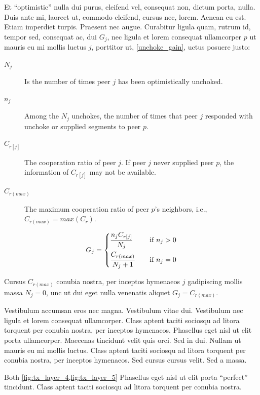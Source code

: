 Et ``optimistic'' nulla dui purus, eleifend vel, consequat non, dictum porta, nulla. Duis ante mi, laoreet ut, commodo eleifend, cursus nec, lorem. Aenean eu est. Etiam imperdiet turpis. Praesent nec augue. Curabitur ligula quam, rutrum id, tempor sed, consequat ac, dui $G_j$, nec ligula et lorem consequat ullamcorper $p$ ut mauris eu mi mollis luctus $j$, porttitor ut, \ref{unchoke_gain}, uctus posuere justo:

\begin{description}
  \item[$N_j$] Is the number of times peer $j$ has been optimistically unchoked.
  \item[$n_j$] Among the $N_j$ unchokes, the number of times that peer $j$ responded with unchoke or supplied segments to peer $p$.
  \item[$C_{r[j]}$] The cooperation ratio of peer $j$. If peer $j$ never supplied peer $p$, the information of $C_{r[j]}$ may not be available.
  \item[$C_{r (max)}$] The maximum cooperation ratio of peer $p$’s neighbors, i.e., $C_{r (max)} = max(C_r)$.
\end{description}

\begin{equation}
\label{unchoke_gain}
 G_j =
  \begin{dcases}
    \frac{n_j C_{r[j]}}{N_j} &\quad \text{if } n_j > 0\\
    \frac{C_{r (max)}}{N_j + 1} &\quad \text{if } n_j = 0
  \end{dcases}
\end{equation}

Cursus $C_{r (max)}$ conubia nostra, per inceptos hymenaeos $j$ gadipiscing mollis massa $N_j = 0$, unc ut dui eget nulla venenatis aliquet $G_j = C_{r (max)}$.

Vestibulum accumsan eros nec magna. Vestibulum vitae dui. Vestibulum nec ligula et lorem consequat ullamcorper. Class aptent taciti sociosqu ad litora torquent per conubia nostra, per inceptos hymenaeos. Phasellus eget nisl ut elit porta ullamcorper. Maecenas tincidunt velit quis orci. Sed in dui. Nullam ut mauris eu mi mollis luctus. Class aptent taciti sociosqu ad litora torquent per conubia nostra, per inceptos hymenaeos. Sed cursus cursus velit. Sed a massa. 

Both \ref{fig:tx_layer_4,fig:tx_layer_5} Phasellus eget nisl ut elit porta ``perfect'' tincidunt. Class aptent taciti sociosqu ad litora torquent per conubia nostra.


